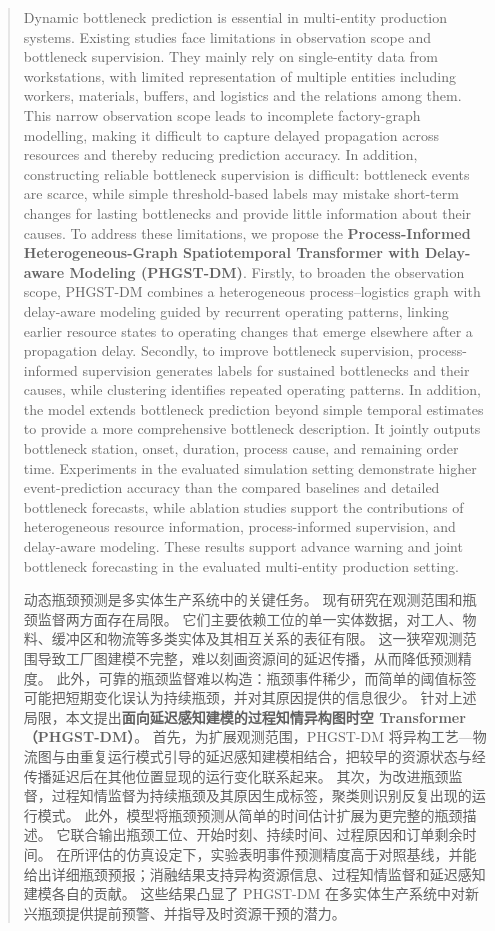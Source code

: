 \documentclass[a4paper,fleqn]{cas-dc}
\newcommand{\zhpara}[1]{%
  \par\begingroup\small\color{black!72}\noindent #1\par\endgroup}
\begin{document}
\begin{abstract}
Dynamic bottleneck prediction is essential in multi-entity production systems.
Existing studies face limitations in observation scope and bottleneck supervision.
They mainly rely on single-entity data from workstations, with limited representation of multiple entities including workers, materials, buffers, and logistics and the relations among them.
This narrow observation scope leads to incomplete factory-graph modelling, making it difficult to capture delayed propagation across resources and thereby reducing prediction accuracy.
In addition, constructing reliable bottleneck supervision is difficult: bottleneck events are scarce, while simple threshold-based labels may mistake short-term changes for lasting bottlenecks and provide little information about their causes.
To address these limitations, we propose the \textbf{Process-Informed Heterogeneous-Graph Spatiotemporal Transformer with Delay-aware Modeling (PHGST-DM)}.
Firstly, to broaden the observation scope, PHGST-DM combines a heterogeneous process--logistics graph with delay-aware modeling guided by recurrent operating patterns, linking earlier resource states to operating changes that emerge elsewhere after a propagation delay.
Secondly, to improve bottleneck supervision, process-informed supervision generates labels for sustained bottlenecks and their causes, while clustering identifies repeated operating patterns.
In addition, the model extends bottleneck prediction beyond simple temporal estimates to provide a more comprehensive bottleneck description.
It jointly outputs bottleneck station, onset, duration, process cause, and remaining order time.
Experiments in the evaluated simulation setting demonstrate higher event-prediction accuracy than the compared baselines and detailed bottleneck forecasts, while ablation studies support the contributions of heterogeneous resource information, process-informed supervision, and delay-aware modeling.
These results support advance warning and joint bottleneck forecasting in the evaluated multi-entity production setting.

\zhpara{动态瓶颈预测是多实体生产系统中的关键任务。
现有研究在观测范围和瓶颈监督两方面存在局限。
它们主要依赖工位的单一实体数据，对工人、物料、缓冲区和物流等多类实体及其相互关系的表征有限。
这一狭窄观测范围导致工厂图建模不完整，难以刻画资源间的延迟传播，从而降低预测精度。
此外，可靠的瓶颈监督难以构造：瓶颈事件稀少，而简单的阈值标签可能把短期变化误认为持续瓶颈，并对其原因提供的信息很少。
针对上述局限，本文提出\textbf{面向延迟感知建模的过程知情异构图时空 Transformer（PHGST-DM）}。
首先，为扩展观测范围，PHGST-DM 将异构工艺—物流图与由重复运行模式引导的延迟感知建模相结合，把较早的资源状态与经传播延迟后在其他位置显现的运行变化联系起来。
其次，为改进瓶颈监督，过程知情监督为持续瓶颈及其原因生成标签，聚类则识别反复出现的运行模式。
此外，模型将瓶颈预测从简单的时间估计扩展为更完整的瓶颈描述。
它联合输出瓶颈工位、开始时刻、持续时间、过程原因和订单剩余时间。
在所评估的仿真设定下，实验表明事件预测精度高于对照基线，并能给出详细瓶颈预报；消融结果支持异构资源信息、过程知情监督和延迟感知建模各自的贡献。
这些结果凸显了 PHGST-DM 在多实体生产系统中对新兴瓶颈提供提前预警、并指导及时资源干预的潜力。}


\end{abstract}
\end{document}
